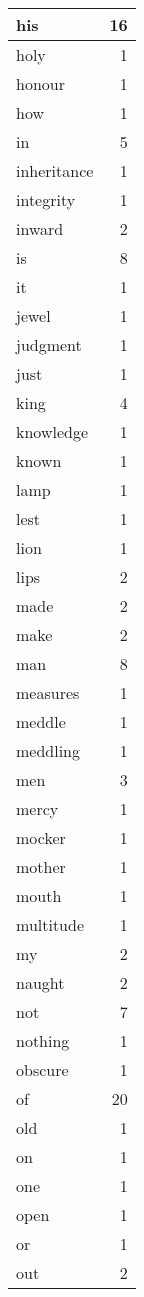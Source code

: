 \begin{center}
\begin{longtable}{l|r}
his & 16\\ \hline 
holy & 1\\ \hline 
honour & 1\\ \hline 
how & 1\\ \hline 
in & 5\\ \hline 
inheritance & 1\\ \hline 
integrity & 1\\ \hline 
inward & 2\\ \hline 
is & 8\\ \hline 
it & 1\\ \hline 
jewel & 1\\ \hline 
judgment & 1\\ \hline 
just & 1\\ \hline 
king & 4\\ \hline 
knowledge & 1\\ \hline 
known & 1\\ \hline 
lamp & 1\\ \hline 
lest & 1\\ \hline 
lion & 1\\ \hline 
lips & 2\\ \hline 
made & 2\\ \hline 
make & 2\\ \hline 
man & 8\\ \hline 
measures & 1\\ \hline 
meddle & 1\\ \hline 
meddling & 1\\ \hline 
men & 3\\ \hline 
mercy & 1\\ \hline 
mocker & 1\\ \hline 
mother & 1\\ \hline 
mouth & 1\\ \hline 
multitude & 1\\ \hline 
my & 2\\ \hline 
naught & 2\\ \hline 
not & 7\\ \hline 
nothing & 1\\ \hline 
obscure & 1\\ \hline 
of & 20\\ \hline 
old & 1\\ \hline 
on & 1\\ \hline 
one & 1\\ \hline 
open & 1\\ \hline 
or & 1\\ \hline 
out & 2\\ \hline 

\end{longtable}
\end{center}
